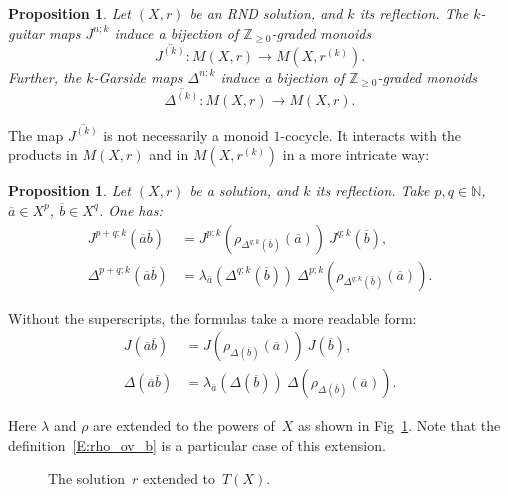 \documentclass{amsart}
\newcommand{\N}{\mathbb{N}}
\newcommand{\Z}{\mathbb{Z}}
\theoremstyle{plain}
\newtheorem{pro}[thm]{Proposition}
\theoremstyle{definition}
\theoremstyle{remark}
\begin{document}
\begin{pro}\label{P:GuitarForMonoids}
Let $(X,r)$ be an RND solution, and $k$ its reflection. The $k$-guitar maps $J^{n;k}$ induce a bijection of $\Z_{\geq 0}$-graded monoids 
\[\overline{J^{(k)}} \colon M(X,r) \to M(X,r^{(k)}).\]
Further, the $k$-Garside maps $\Delta^{n;k}$ induce a bijection of $\Z_{\geq 0}$-graded monoids 
\[\overline{\Delta^{(k)}} \colon M(X,r) \to M(X,r).\]
\end{pro}

The map $\overline{J^{(k)}}$ is not necessarily a monoid $1$-cocycle. It interacts with the products in $M(X,r)$ and in $M(X,r^{(k)})$ in a more intricate way:
 
\begin{pro}\label{P:Almost1cocycle}
Let $(X,r)$ be a solution, and $k$ its reflection. Take $p,q \in \N$, $\overline{a} \in X^p$, $\overline{b} \in X^q$. One has:  
\begin{align}
J^{p+q;k}(\overline{a}\overline{b}) &= J^{p;k}(\rho_{\Delta^{q;k}(\overline{b})}(\overline{a}))\ J^{q;k}(\overline{b}),\label{E:Jproduct}\\
\Delta^{p+q;k}(\overline{a}\overline{b}) &= \lambda_{\overline{a}}(\Delta^{q;k}(\overline{b}))\ \Delta^{p;k}(\rho_{\Delta^{q;k}(\overline{b})}(\overline{a})).\label{E:Dproduct}
\end{align}
\end{pro}

Without the superscripts, the formulas take a more readable form:
\begin{align}
J(\overline{a}\overline{b}) &= J(\rho_{\Delta(\overline{b})}(\overline{a}))\ J(\overline{b}),\label{E:JproductShort}\\
\Delta(\overline{a}\overline{b}) &= \lambda_{\overline{a}}(\Delta(\overline{b}))\ \Delta(\rho_{\Delta(\overline{b})}(\overline{a})).\label{E:DproductShort}
\end{align}

Here $\lambda$ and $\rho$ are extended to the powers of~$X$ as shown in Fig~\ref{P:TX}. Note that the definition~\eqref{E:rho_ov_b} is a particular case of this extension.


\begin{figure}[h]
\caption{The solution~$r$ extended to~$T(X)$.}\label{P:TX}
\end{figure}
\end{document}
